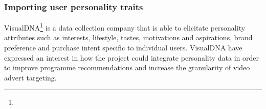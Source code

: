 

	\subsubsection{Importing user personality traits}
	VisualDNA\footnote{} is a data collection company that is able to elicitate personality attributes such as interests, lifestyle, tastes, motivations and aspirations, brand preference and purchase intent specific to individual users. VisualDNA have expressed an interest in how the project could integrate personality data in order to improve programme recommendations and increase the granularity of video advert targeting.

